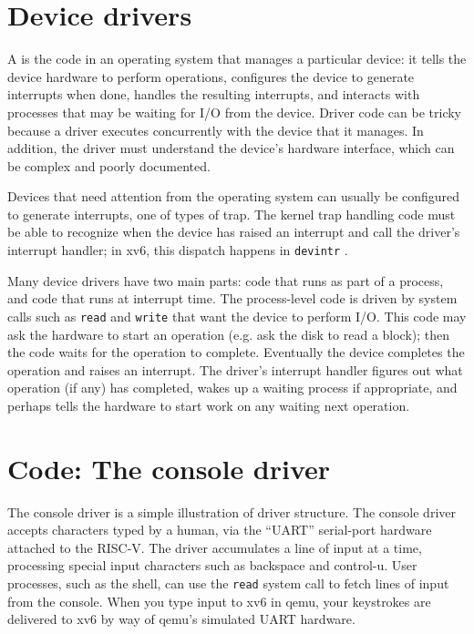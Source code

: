 \section{Device drivers}

A
is the code in an operating system that manages a particular device:
it tells the device hardware to perform operations,
configures the device to generate interrupts when done,
handles the resulting interrupts,
and interacts with processes that may be waiting
for I/O from the device.
Driver code can be tricky
because a driver executes concurrently with the device that it manages.  In
addition, the driver must understand the device's hardware interface,
which can be complex and poorly documented.

Devices that need attention from the operating system can usually be
configured to generate interrupts, one of types of trap.
The kernel trap handling code must be able to recognize when the device
has raised an interrupt and call the driver's interrupt handler;
in xv6, this dispatch happens in {\tt devintr} .

Many device drivers have two main parts: code that runs as part of a
process, and code that runs at interrupt time. The process-level code
is driven by system calls such as {\tt read} and {\tt write} that want
the device to perform I/O. This code may ask the hardware to start an
operation (e.g. ask the disk to read a block); then the code waits for
the operation to complete. Eventually the device completes the
operation and raises an interrupt. The driver's interrupt handler
figures out what operation (if any) has completed, wakes up a waiting
process if appropriate, and perhaps tells the hardware to start work
on any waiting next operation.

\section{Code: The console driver}

The console driver is a simple illustration of driver structure. The
console driver accepts characters typed by a human, via the ``UART''
serial-port hardware attached to the RISC-V. The driver accumulates a
line of input at a time, processing special input characters such as
backspace and control-u. User processes, such as the shell, can use
the {\tt read} system call to fetch lines of input from the console.
When you type input to xv6 in qemu, your keystrokes are delivered to
xv6 by way of qemu's simulated UART hardware.

